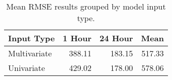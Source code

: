 \begin{table}[H]
\centering
\begin{tabular}{lrrr}
\toprule
Input Type & 1 Hour & 24 Hour & Mean \\
\midrule
Multivariate & 388.11 & 183.15 & 517.33 \\
Univariate & 429.02 & 178.00 & 578.06 \\
\bottomrule
\end{tabular}
\caption{Mean RMSE results grouped by model input type.}
\label{input-type-RMSE}
\end{table}
